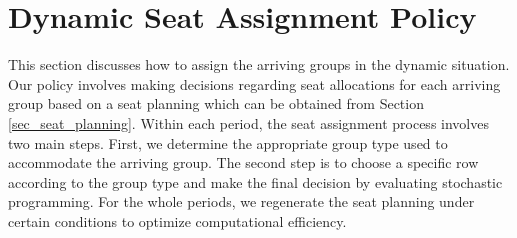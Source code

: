 \section{Dynamic Seat Assignment Policy}\label{sec_dynamic}


This section discusses how to assign the arriving groups in the dynamic situation. Our policy involves making decisions regarding seat allocations for each arriving group based on a seat planning which can be obtained from Section \ref{sec_seat_planning}. Within each period, the seat assignment process involves two main steps. First, we determine the appropriate group type used to accommodate the arriving group. The second step is to choose a specific row according to the group type and make the final decision by evaluating stochastic programming. For the whole periods, we regenerate the seat planning under certain conditions to optimize computational efficiency.









